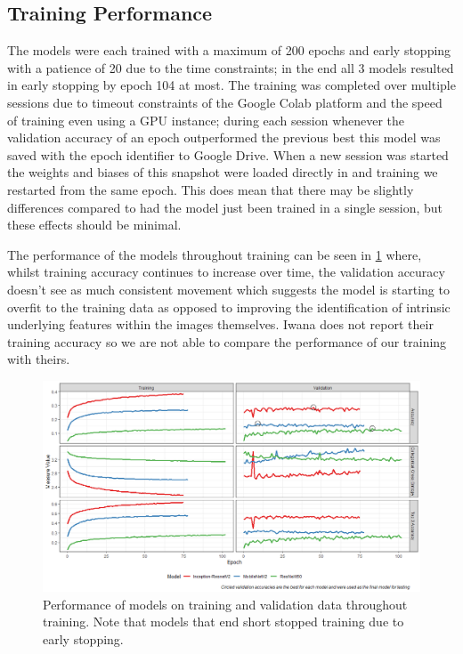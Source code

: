 \documentclass[12pt]{article}
\numberwithin{equation}{section}
\numberwithin{figure}{section}
\begin{document}
\subsection{Training Performance} 
\label{sub:Training_Performance} 
The models were each trained with a maximum of 200 epochs and early stopping with a patience of 20 due to the time constraints; in the end all 3 models resulted in early stopping by epoch 104 at most. The training was completed over multiple sessions due to timeout constraints of the Google Colab platform and the speed of training even using a GPU instance; during each session whenever the validation accuracy of an epoch outperformed the previous best this model was saved with the epoch identifier to Google Drive. When a new session was started the weights and biases of this snapshot were loaded directly in and training we restarted from the same epoch. This does mean that there may be slightly differences compared to had the model just been trained in a single session, but these effects should be minimal. 

The performance of the models throughout training can be seen in \cref{fig:train_perf} where, whilst training accuracy continues to increase over time, the validation accuracy doesn't see as much consistent movement which suggests the model is starting to overfit to the training data as opposed to improving the identification of intrinsic underlying features within the images themselves. Iwana does not report their training accuracy so we are not able to compare the performance of our training with theirs.

\begin{figure}
	\centering
	\captionsetup{justification=centering}
	\includegraphics[scale=0.5]{training_results.png}
	\caption{Performance of models on training and validation data throughout training. Note that models that end short stopped training due to early stopping.}
	\label{fig:train_perf}
\end{figure}
\end{document}
